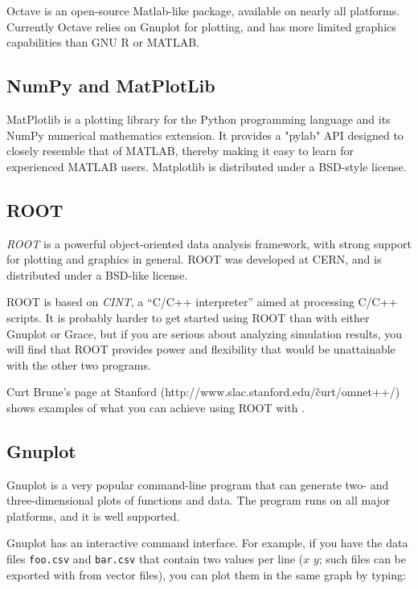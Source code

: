 Octave is an open-source Matlab-like package, available on nearly all platforms.
Currently Octave relies on Gnuplot for plotting, and has more limited
graphics capabilities than GNU R or MATLAB.

\subsection{NumPy and MatPlotLib}

MatPlotlib is a plotting library for the Python programming language and
its NumPy numerical mathematics extension. It provides a "pylab" API designed
to closely resemble that of MATLAB, thereby making it easy to learn
for experienced MATLAB users. Matplotlib is distributed under a BSD-style
license.


\subsection{ROOT}

\textit{ROOT} is a powerful object-oriented data analysis framework,
with strong support for plotting and graphics in general.
ROOT was developed at CERN, and is distributed under a BSD-like license.

ROOT is based on \textit{CINT}, a ``C/C++ interpreter''
aimed at processing C/C++ scripts. It is probably harder to get started
using ROOT than with either Gnuplot or Grace, but if you are serious
about analyzing simulation results, you will find that ROOT provides
power and flexibility that would be unattainable with the other two programs.

Curt Brune's page at Stanford (http://www.slac.stanford.edu/\~curt/omnet++/)
shows examples of what you can achieve using ROOT with {\opp}.


\subsection{Gnuplot}
\label{sec:ana-sim:gnuplot}

Gnuplot is a very popular command-line program that can generate two-
and three-dimensional plots of functions and data. The program runs
on all major platforms, and it is well supported.

Gnuplot has an interactive command interface. For example, if you have
the data files \texttt{foo.csv} and \texttt{bar.csv} that contain
two values per line ($x$ $y$; such files can be exported with
 from vector files), you can plot them in the same
graph by typing:

